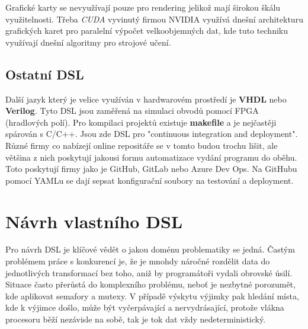 \documentclass[male,czech]{kithesis}
\begin{document}
Grafické karty se nevyužívají pouze pro rendering jelikož mají širokou škálu
využitelnosti. 
Třeba \textit{CUDA} vyvinutý firmou NVIDIA 
využívá dnešní architekturu grafických karet pro paralelní výpočet 
velkoobjemných dat, kde tuto techniku využívají dnešní algoritmy pro 
strojové učení. 

\section{Ostatní DSL}
Další jazyk který je velice využíván v hardwarovém prostředí je \textbf{VHDL} nebo \textbf{Verilog}. Tyto DSL jsou zaměřená
na simulaci obvodů pomocí FPGA (hradlových polí). 
Pro kompilaci projektů existuje \textbf{makefile} a je nejčastěji spárován s C/C++. 
Jsou zde DSL pro "continuous integration and deployment". 
Různé firmy co nabízejí online repositáře se v tomto budou trochu lišit, ale
většina z nich poskytují jakousi formu automatizace vydání programu do oběhu. Toto poskytují firmy jako je GitHub,
GitLab nebo Azure Dev Ops. Na GitHubu pomocí YAMLu se dají sepsat konfigurační soubory 
na testování a deployment.

{\centering
{}
}

\chapter{Návrh vlastního DSL}

Pro návrh DSL je klíčové vědět o jakou doménu problematiky se jedná.
Častým problémem práce s konkurencí je, 
že je mnohdy náročné rozdělit data do jednotlivých transformací bez toho, 
aniž by programátoři vydali obrovské úsilí.
Situace často přerůstá do komplexního problému, 
neboť je nezbytné porozumět, 
kde aplikovat semafory a mutexy. 
V případě výskytu výjimky pak hledání místa, 
kde k výjimce došlo, 
může být vyčerpávající a nervydrásající,
protože vlákna procesoru běží nezávisle na sobě,
tak je tok dat vždy nedeterministický.
\end{document}
